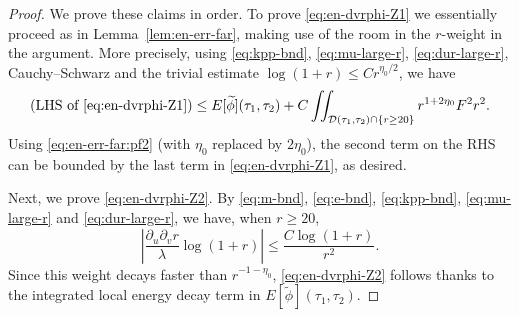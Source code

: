 \documentclass[10pt, reqno]{amsart}
\theoremstyle{definition}
\theoremstyle{remark}
\theoremstyle{conjecture}
\numberwithin{equation}{section}
\newcommand{\set}[1]{\{#1\}}
\newcommand{\rd}{\partial}
\newcommand{\0}{\emptyset}
\newcommand{\lmb}{\lambda}
\newcommand{\calD}{\mathcal D}
\newcommand{\dvr}{\lmb}
\newcommand{\phibg}{\overline{\phi}}				%
\newcommand{\phidf}{\widetilde{\phi}}				%
\newcommand{\Abs}[1]{\left\vert #1 \right\vert}
\begin{document}
\begin{proof}
We prove these claims in order. To prove \eqref{eq:en-dvrphi-Z1} we essentially proceed as in Lemma~\ref{lem:en-err-far}, making use of the room in the $r$-weight in the argument. More precisely, using \eqref{eq:kpp-bnd}, \eqref{eq:mu-large-r}, \eqref{eq:dur-large-r}, Cauchy--Schwarz and the trivial estimate $\log(1+r) \leq C r^{\eta_{0} / 2}$, we have
\begin{equation*}
	(\hbox{LHS of \eqref{eq:en-dvrphi-Z1}})
	\leq E[\phidf](\tau_{1}, \tau_{2})
	+ C \iint_{\calD(\tau_{1}, \tau_{2}) \cap \set{r \geq 20}} r^{1+2\eta_{0}} F^{2} r^{2}.
\end{equation*}
Using \eqref{eq:en-err-far:pf2} (with $\eta_0$ replaced by $2\eta_0$), the second term on the RHS can be bounded by the last term in \eqref{eq:en-dvrphi-Z1}, as desired.

Next, we prove \eqref{eq:en-dvrphi-Z2}. By \eqref{eq:m-bnd}, \eqref{eq:e-bnd}, \eqref{eq:kpp-bnd}, \eqref{eq:mu-large-r} and \eqref{eq:dur-large-r}, we have, when $r\geq 20$,
\begin{equation*}
	\Abs{\frac{\rd_{u}\rd_{v} r}{\dvr} \log (1+r)} \leq \frac{C \log (1+r)}{r^{2}}.
\end{equation*}
Since this weight decays faster than $r^{-1-\eta_{0}}$, \eqref{eq:en-dvrphi-Z2} follows thanks to the integrated local energy decay term in $E[\phidf](\tau_{1}, \tau_{2})$.


\end{proof}
\end{document}
